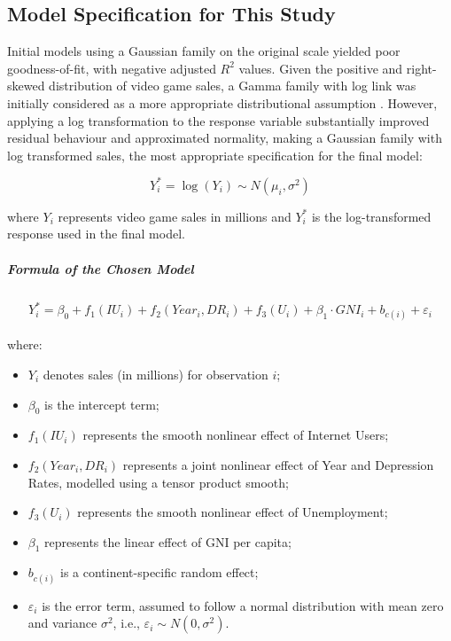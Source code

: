 \subsection{Model Specification for This Study}
Initial models using a Gaussian family on the original scale 
yielded poor goodness-of-fit, with negative adjusted $R^2$ values. 
Given the positive and right-skewed distribution of video game 
sales, a Gamma family with log link was initially considered as 
a more appropriate distributional assumption \cite{hosch2026gamma}. 
However, applying a log transformation to the response variable 
substantially improved residual behaviour and approximated 
normality, making a Gaussian family with log transformed sales, 
the most appropriate specification for the final model:

\begin{equation}
Y_i^* = \log(Y_i) \sim N(\mu_i, \sigma^2)
\end{equation}

where $Y_i$ represents video game sales in millions and $Y_i^*$ 
is the log-transformed response used in the final model.

\subparagraph{Formula of the Chosen Model}
\begin{equation}
\begin{aligned}
Y_i^* = \beta_0 + f_1(IU_i) + f_2(Year_i, DR_i) + f_3(U_i) + \beta_1 \cdot GNI_i + b_{c(i)} + \varepsilon_i
\end{aligned}
\end{equation}

where:

\begin{itemize}
    \item $Y_i$ denotes sales (in millions) for observation $i$;

    \item $\beta_0$ is the intercept term;
    
    \item $f_1(IU_i)$ represents the smooth nonlinear effect of Internet Users;
    
    \item $f_2(Year_i,DR_i)$ represents a joint nonlinear effect of Year and Depression Rates, modelled using a tensor product smooth;
    
    \item $f_3(U_i)$ represents the smooth nonlinear effect of Unemployment;
    
    \item $\beta_1$ represents the linear effect of GNI per capita;
    
    \item $b_{c(i)}$ is a continent-specific random effect;
    
    \item $\varepsilon_i$ is the error term, assumed to follow a normal distribution with mean zero and variance $\sigma^2$, i.e.,
    $\varepsilon_i \sim N(0,\sigma^2)$.
\end{itemize}

